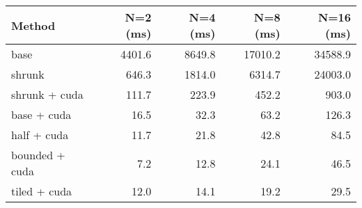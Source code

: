 \begin{tabular}{lrrrr}
\hline
 Method         &   N=2 (ms) &   N=4 (ms) &   N=8 (ms) &   N=16 (ms) \\
\hline
 base           &     4401.6 &     8649.8 &    17010.2 &     34588.9 \\
 shrunk         &      646.3 &     1814.0 &     6314.7 &     24003.0 \\
 shrunk + cuda  &      111.7 &      223.9 &      452.2 &       903.0 \\
 base + cuda    &       16.5 &       32.3 &       63.2 &       126.3 \\
 half + cuda    &       11.7 &       21.8 &       42.8 &        84.5 \\
 bounded + cuda &        7.2 &       12.8 &       24.1 &        46.5 \\
 tiled + cuda   &       12.0 &       14.1 &       19.2 &        29.5 \\
\hline
\end{tabular}
